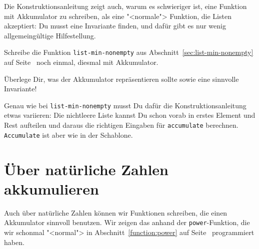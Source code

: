 %
Die Konstruktionsanleitung zeigt auch, warum es schwieriger ist, eine
Funktion mit Akkumulator zu schreiben, als eine "<normale"> Funktion,
die Listen akzeptiert: Du musst eine Invariante finden, und dafür gibt
es nur wenig allgemeingültige Hilfestellung.

\begin{aufgabeinline}\label{aufgabe:list-min-nonemepty-acc}
  Schreibe die Funktion \lstinline{list-min-nonempty} aus
  Abschnitt~\ref{sec:list-min-nonempty} auf
  Seite~\pageref{sec:list-min-nonempty} noch einmal, diesmal mit
  Akkumulator.

  Überlege Dir, was der Akkumulator repräsentieren sollte sowie eine
  sinnvolle Invariante!

  Genau wie bei \lstinline{list-min-nonempty} musst Du dafür die
  Konstruktionsanleitung etwas variieren: Die nichtleere Liste kannst
  Du schon vorab in erstes Element und Rest aufteilen und daraus die
  richtigen Eingaben für \lstinline{accumulate} berechnen.
  \lstinline{Accumulate} ist aber wie in der Schablone.
\end{aufgabeinline}
%

\section{Über natürliche Zahlen akkumulieren}

Auch über natürliche Zahlen können wir Funktionen schreiben, die einen
Akkumulator sinnvoll benutzen.  Wir zeigen das anhand der
\lstinline{power}-Funktion, die wir schonmal "<normal"> in
Abschnitt~\ref{function:power} auf Seite~\pageref{function:power}
programmiert haben.

